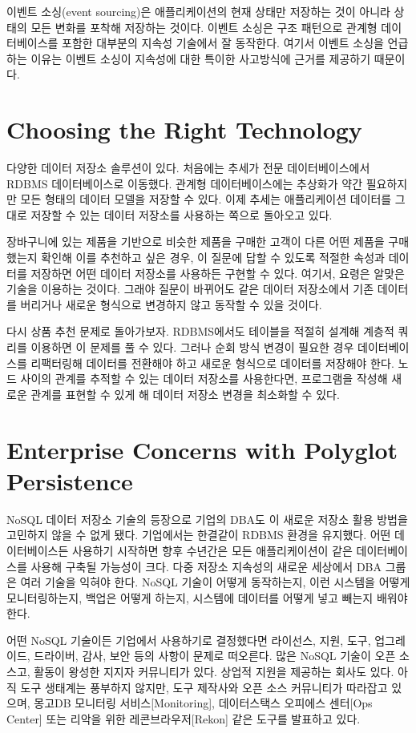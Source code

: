 \documentclass[twocolumn]{article}
\begin{document}
이벤트 소싱(event sourcing)은 애플리케이션의 현재 상태만 저장하는 것이 아니라 상태의 모든 변화를 포착해 저장하는 것이다. 이벤트 소싱은 구조 패턴으로 관계형 데이터베이스를 포함한 대부분의 지속성 기술에서 잘 동작한다. 여기서 이벤트 소싱을 언급하는 이유는 이벤트 소싱이 지속성에 대한 특이한 사고방식에 근거를 제공하기 때문이다.

\section{Choosing the Right Technology}
다양한 데이터 저장소 솔루션이 있다. 처음에는 추세가 전문 데이터베이스에서 RDBMS 데이터베이스로 이동했다. 관계형 데이터베이스에는 추상화가 약간 필요하지만 모든 형태의 데이터 모델을 저장할 수 있다. 이제 추세는 애플리케이션 데이터를 그대로 저장할 수 있는 데이터 저장소를 사용하는 쪽으로 돌아오고 있다.

장바구니에 있는 제품을 기반으로 비슷한 제품을 구매한 고객이 다른 어떤 제품을 구매했는지 확인해 이를 추천하고 싶은 경우, 이 질문에 답할 수 있도록 적절한 속성과 데이터를 저장하면 어떤 데이터 저장소를 사용하든 구현할 수 있다. 여기서, 요령은 알맞은 기술을 이용하는 것이다. 그래야 질문이 바뀌어도 같은 데이터 저장소에서 기존 데이터를 버리거나 새로운 형식으로 변경하지 않고 동작할 수 있을 것이다.

다시 상품 추천 문제로 돌아가보자. RDBMS에서도 테이블을 적절히 설계해 계층적 쿼리를 이용하면 이 문제를 풀 수 있다. 그러나 순회 방식 변경이 필요한 경우 데이터베이스를 리팩터링해 데이터를 전환해야 하고 새로운 형식으로 데이터를 저장해야 한다. 노드 사이의 관계를 추적할 수 있는 데이터 저장소를 사용한다면, 프로그램을 작성해 새로운 관계를 표현할 수 있게 해 데이터 저장소 변경을 최소화할 수 있다.

\section{Enterprise Concerns with Polyglot Persistence}
NoSQL 데이터 저장소 기술의 등장으로 기업의 DBA도 이 새로운 저장소 활용 방법을 고민하지 않을 수 없게 됐다. 기업에서는 한결같이 RDBMS 환경을 유지했다. 어떤 데이터베이스든 사용하기 시작하면 향후 수년간은 모든 애플리케이션이 같은 데이터베이스를 사용해 구축될 가능성이 크다. 다중 저장소 지속성의 새로운 세상에서 DBA 그룹은 여러 기술을 익혀야 한다. NoSQL 기술이 어떻게 동작하는지, 이런 시스템을 어떻게 모니터링하는지, 백업은 어떻게 하는지, 시스템에 데이터를 어떻게 넣고 빼는지 배워야 한다.

어떤 NoSQL 기술이든 기업에서 사용하기로 결정했다면 라이선스, 지원, 도구, 업그레이드, 드라이버, 감사, 보안 등의 사항이 문제로 떠오른다. 많은 NoSQL 기술이 오픈 소스고, 활동이 왕성한 지지자 커뮤니티가 있다. 상업적 지원을 제공하는 회사도 있다. 아직 도구 생태계는 풍부하지 않지만, 도구 제작사와 오픈 소스 커뮤니티가 따라잡고 있으며, 몽고DB 모니터링 서비스[Monitoring], 데이터스택스 오피에스 센터[Ops Center] 또는 리악을 위한 레콘브라우저[Rekon] 같은 도구를 발표하고 있다.
\end{document}
